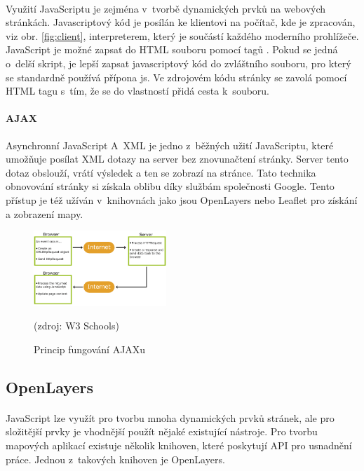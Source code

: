 \documentclass[11pt,a4paper,titlepage,oneside]{book}
\begin{document}

		\paragraph{} Využití JavaScriptu je zejména v~tvorbě dynamických prvků na webových stránkách. Javascriptový kód je posílán ke klientovi na počítač, kde je zpracován, viz obr. \ref{fig:client}, interpreterem, který je součástí každého moderního prohlížeče. JavaScript je možné zapsat do \ac{HTML} souboru pomocí tagů . Pokud se jedná o~delší skript, je lepší zapsat javascriptový kód do zvláštního souboru, pro který se standardně používá přípona js. Ve zdrojovém kódu stránky se zavolá pomocí \ac{HTML} tagu  s~tím, že se do vlastností přidá cesta k~souboru.
		\paragraph{AJAX} Asynchronní JavaScript A~XML je jedno z~běžných užití Java\-Scriptu, které umožňuje posílat \ac{XML} dotazy na server bez znovunačtení stránky. Server tento dotaz obslouží, vrátí výsledek a ten se zobrazí na stránce. Tato technika obnovování stránky si získala oblibu díky službám společnosti Google. Tento přístup je též užíván v~knihovnách jako jsou OpenLayers nebo Leaflet pro získání a zobrazení mapy.

		\begin{figure}[!h]
			\begin{center}
				\includegraphics[width=5cm]{obrazky/ajax.png}
				\caption{Princip fungování AJAXu}
				\label{fig:ajax}
				(zdroj: W3 Schools\cite{w3school})
			\end{center}
		\end{figure}	

		\subsection{OpenLayers} %
			\paragraph{} JavaScript lze využít pro tvorbu mnoha dynamických prvků stránek, ale pro složitější prvky je vhodnější použít nějaké existující nástroje. Pro tvorbu mapových aplikací existuje několik knihoven, které poskytují  API  pro usnadnění práce. Jednou z~takových knihoven je OpenLayers.
\end{document}
